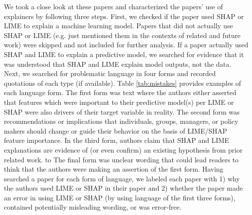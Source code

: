 \documentclass[mnsc,blindrev]{informs3}
\begin{document}
        We took a close look at these papers and characterized the papers' use of explainers by following three steps. First, we checked if the paper used SHAP or LIME to explain a machine learning model. Papers that did not actually use SHAP or LIME (e.g. just mentioned them in the contexts of related and future work) were skipped and not included for further analysis. If a paper actually used SHAP and LIME to explain a predictive model, we searched for evidence that it was understood that SHAP and LIME explain model outputs, not the data. Next, we searched for problematic language in four forms and recorded quotations of each type (if available). Table \ref{tab:mistakes} provides examples of each language form. The first form was text where the authors either asserted that features which were important to their predictive model(s) per LIME or SHAP were also drivers of their target variable in reality. The second form was recommendations or implications that individuals, groups, managers, or policy makers should change or guide their behavior on the basis of LIME/SHAP feature importance. In the third form, authors claim that SHAP and LIME explanations are evidence of (or even confirm) an existing hypothesis from prior related work. to The final form was unclear wording that could lead readers to think that the authors were making an assertion of the first form. Having searched a paper for each form of language, we labeled each paper with 1) why the authors used LIME or SHAP in their paper and 2) whether the paper made an error in using LIME or SHAP (by using language of the first three forms), contained potentially misleading wording, or was error-free. 
        
\end{document}
